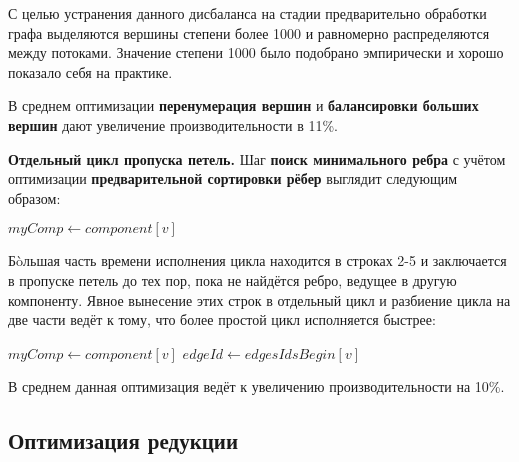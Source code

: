 \documentclass[a4paper,12pt]{extarticle}
\begin{document}
С целью устранения данного дисбаланса на стадии предварительно обработки графа выделяются вершины степени более 1000 и равномерно распределяются между потоками. Значение степени 1000 было подобрано эмпирически и хорошо показало себя на практике.

В среднем оптимизации \textbf{перенумерация вершин} и \textbf{балансировки больших вершин} дают увеличение производительности в 11\%.



\textbf{Отдельный цикл пропуска петель.}
Шаг \textbf{поиск минимального ребра} с учётом оптимизации \textbf{предварительной сортировки рёбер} выглядит следующим образом:

\begin{algorithm}[H]
    \SetAlgoLined
    $myComp \gets component[v]$\;
\end{algorithm}

Б\`oльшая часть времени исполнения цикла находится в строках 2-5 и заключается в пропуске петель до тех пор, пока не найдётся ребро, ведущее в другую компоненту. Явное вынесение этих строк в отдельный цикл и разбиение цикла на две части ведёт к тому, что более простой цикл исполняется быстрее:

\begin{algorithm}[H]
    \SetAlgoLined
    $myComp \gets component[v]$\;
    $edgeId \gets edgesIdsBegin[v]$\;
\end{algorithm}

В среднем данная оптимизация ведёт к увеличению производительности на 10\%.


\subsection{Оптимизация редукции}
\label{subsec:optReduction}
\end{document}
